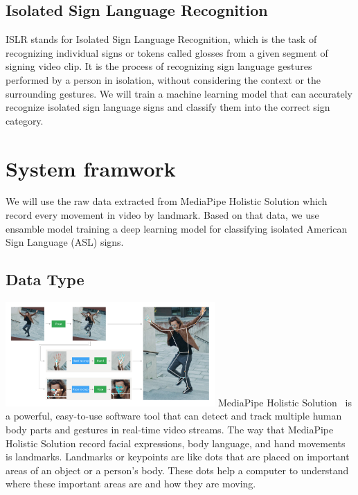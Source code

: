 \documentclass[10pt,twocolumn,letterpaper]{article}
\begin{document}
\begin{CJK*}{UTF8}{bsmi}
\subsection{Isolated Sign Language Recognition}

ISLR stands for Isolated Sign Language Recognition, which is the task of recognizing individual signs or tokens called glosses from a given segment of signing video clip.
It is the process of recognizing sign language gestures performed by a person in isolation, without considering the context or the surrounding gestures. 
We will train a machine learning model that can accurately recognize isolated sign language signs and classify them into the correct sign category.

\section{System framwork}
\label{sec:formatting}

We will use the raw data extracted from MediaPipe Holistic Solution which record every movement in video by landmark.
Based on that data, we use ensamble model training a deep learning model for classifying isolated American Sign Language (ASL) signs.

\subsection{Data Type}
\includegraphics[width=80mm]{holistic_pipeline_example}
MediaPipe Holistic Solution~\cite{https://doi.org/10.48550/arxiv.1906.08172} is a powerful, easy-to-use software tool that can detect and track multiple human body parts and gestures in real-time video streams. 
The way that MediaPipe Holistic Solution record facial expressions, body language, and hand movements is landmarks.
Landmarks or keypoints are like dots that are placed on important areas of an object or a person's body. 
These dots help a computer to understand where these important areas are and how they are moving.


\end{CJK*}
\end{document}
